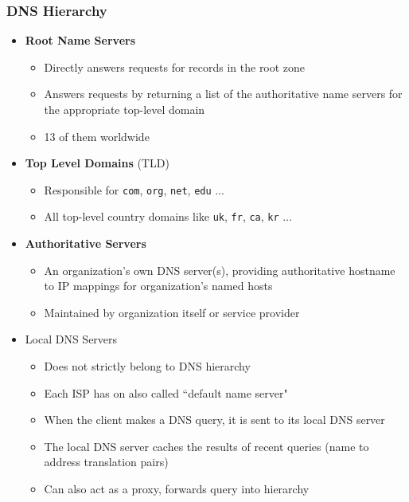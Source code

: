 \subsubsection{DNS Hierarchy}
\begin{itemize}
	\item \textbf{Root Name Servers}
	\begin{itemize}
		\item Directly answers requests for records in the root zone
		\item Answers requests by returning a list of the authoritative name servers for the appropriate top-level domain
		\item 13 of them worldwide
	\end{itemize}
	\item \textbf{Top Level Domains} (TLD)
	\begin{itemize}
		\item Responsible for \texttt{com}, \texttt{org}, \texttt{net}, \texttt{edu} ...
		\item All top-level country domains like \texttt{uk}, \texttt{fr}, \texttt{ca}, \texttt{kr} ...
	\end{itemize}
	\item \textbf{Authoritative Servers}
	\begin{itemize}
		\item An organization's own DNS server(s), providing authoritative hostname to IP mappings for organization's named hosts
		\item Maintained by organization itself or service provider
	\end{itemize}
	\item Local DNS Servers
	\begin{itemize}
		\item Does not strictly belong to DNS hierarchy
		\item Each ISP has on also called ``default name server"
		\item When the client makes a DNS query, it is sent to its local DNS server
		\item The local DNS server caches the results of recent queries (name to address translation pairs)
		\item Can also act as a proxy, forwards query into hierarchy
	\end{itemize}
\end{itemize}

